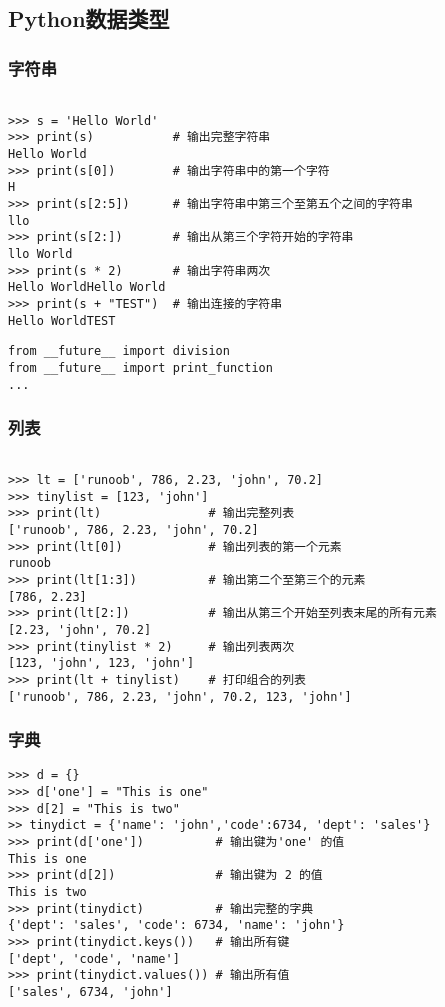 \subsection{Python数据类型}
\subsubsection{字符串}
\begin{verbatim}

>>> s = 'Hello World'
>>> print(s)           # 输出完整字符串
Hello World
>>> print(s[0])        # 输出字符串中的第一个字符
H
>>> print(s[2:5])      # 输出字符串中第三个至第五个之间的字符串
llo
>>> print(s[2:])       # 输出从第三个字符开始的字符串
llo World
>>> print(s * 2)       # 输出字符串两次
Hello WorldHello World
>>> print(s + "TEST")  # 输出连接的字符串
Hello WorldTEST
\end{verbatim}

\begin{verbatim}
from __future__ import division
from __future__ import print_function
...
\end{verbatim}



\subsubsection{列表}
\begin{verbatim}

>>> lt = ['runoob', 786, 2.23, 'john', 70.2]
>>> tinylist = [123, 'john']
>>> print(lt)               # 输出完整列表
['runoob', 786, 2.23, 'john', 70.2]
>>> print(lt[0])            # 输出列表的第一个元素
runoob
>>> print(lt[1:3])          # 输出第二个至第三个的元素 
[786, 2.23]
>>> print(lt[2:])           # 输出从第三个开始至列表末尾的所有元素
[2.23, 'john', 70.2]
>>> print(tinylist * 2)     # 输出列表两次
[123, 'john', 123, 'john']
>>> print(lt + tinylist)    # 打印组合的列表
['runoob', 786, 2.23, 'john', 70.2, 123, 'john']
\end{verbatim}

\subsubsection{字典}
\begin{verbatim}
>>> d = {}
>>> d['one'] = "This is one"
>>> d[2] = "This is two"
>> tinydict = {'name': 'john','code':6734, 'dept': 'sales'}
>>> print(d['one'])          # 输出键为'one' 的值
This is one
>>> print(d[2])              # 输出键为 2 的值
This is two
>>> print(tinydict)          # 输出完整的字典
{'dept': 'sales', 'code': 6734, 'name': 'john'}
>>> print(tinydict.keys())   # 输出所有键
['dept', 'code', 'name']
>>> print(tinydict.values()) # 输出所有值
['sales', 6734, 'john']
\end{verbatim}

